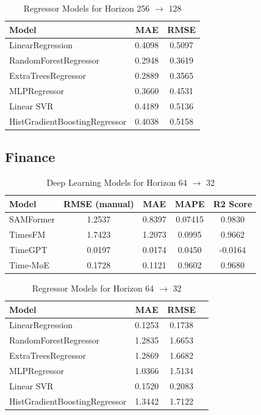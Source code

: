 \begin{table}[h!]
     \centering
     \begin{tabular}{lcc}
     \hline
     Model & MAE & RMSE \\
     \hline
     LinearRegression              & 0.4098 & 0.5097 \\
     RandomForestRegressor         & 0.2948 & 0.3619 \\
     ExtraTreesRegressor           & 0.2889 & 0.3565 \\
     MLPRegressor                  & 0.3660 & 0.4531 \\
     Linear SVR                    & 0.4189 & 0.5136 \\
     HistGradientBoostingRegressor & 0.4038 & 0.5158 \\
     \hline
     \end{tabular}
     \caption{Regressor Models for Horizon 256 $\to$ 128}
     \label{tab:regressors_256to128}
\end{table}
     




\newpage
\subsection{Finance}

\begin{table}[h!]
\centering
\begin{tabular}{lcccc}
\hline
Model & RMSE (manual) & MAE & MAPE & R2 Score \\
\hline
SAMFormer   & 1.2537 & 0.8397 & 0.07415 & 0.9830 \\
TimesFM     & 1.7423 & 1.2073 & 0.0995  & 0.9662 \\
TimeGPT     & 0.0197 & 0.0174 & 0.0450  & -0.0164 \\
Time-MoE    & 0.1728 & 0.1121 & 0.9602  & 0.9680 \\
\hline
\end{tabular}
\caption{Deep Learning Models for Horizon 64 \texorpdfstring{$\to$}{->} 32}
\label{tab:finance_64to32_dl}
\end{table}

\begin{table}[h!]
\centering
\begin{tabular}{lccc}
\hline
Model & MAE & RMSE \\
\hline
LinearRegression              & 0.1253 & 0.1738 \\
RandomForestRegressor         & 1.2835 & 1.6653 \\
ExtraTreesRegressor           & 1.2869 & 1.6682 \\
MLPRegressor                  & 1.0366 & 1.5134 \\
Linear SVR                    & 0.1520 & 0.2083 \\
HistGradientBoostingRegressor & 1.3442 & 1.7122 \\
\hline
\end{tabular}
\caption{Regressor Models for Horizon 64 \texorpdfstring{$\to$}{->} 32}
\label{tab:finance_64to32_reg}
\end{table}

